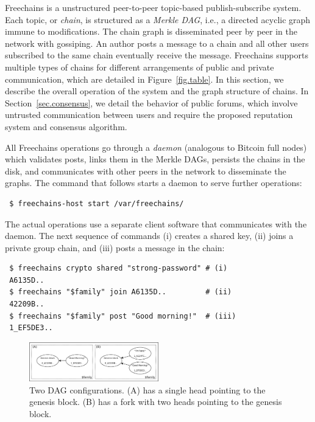 \documentclass[10pt,journal,compsoc]{IEEEtran}
\newcommand{\FC} {Freechains\xspace}
\begin{document}
\FC is a unstructured peer-to-peer topic-based publish-subscribe system.
Each topic, or \emph{chain}, is structured as a \emph{Merkle DAG}, i.e., a
directed acyclic graph immune to modifications.
The chain graph is disseminated peer by peer in the network with gossiping.
An author posts a message to a chain and all other users subscribed to the same
chain eventually receive the message.
\FC supports multiple types of chains for different arrangements of public and
private communication, which are detailed in Figure~\ref{fig.table}.
In this section, we describe the overall operation of the system and the graph
structure of chains.
In Section~\ref{sec.consensus}, we detail the behavior of public forums, which
involve untrusted communication between users and require the proposed
reputation system and consensus algorithm.

All \FC operations go through a \emph{daemon} (analogous to Bitcoin full nodes)
which validates posts, links them in the Merkle DAGs, persists the chains in
the disk, and communicates with other peers in the network to disseminate the
graphs.
The command that follows starts a daemon to serve further operations:

{\footnotesize
\begin{verbatim}
 $ freechains-host start /var/freechains/
\end{verbatim}
}

The actual operations use a separate client software that communicates with the
daemon.
The next sequence of commands (i) creates a shared key, (ii) joins a private
group chain, and (iii) posts a message in the chain:

{\footnotesize
\begin{verbatim}
 $ freechains crypto shared "strong-password" # (i)
 A6135D..
 $ freechains "$family" join A6135D..         # (ii)
 42209B..
 $ freechains "$family" post "Good morning!"  # (iii)
 1_EF5DE3..
\end{verbatim}
}

\begin{figure}[t]
\centering
\includegraphics[width=0.5\textwidth]{family.png}
%
%
\caption{Two DAG configurations. (A) has a single head pointing to the
genesis block. (B) has a fork with two heads pointing to the genesis block.}
\label{fig.family}
\end{figure}
\end{document}
